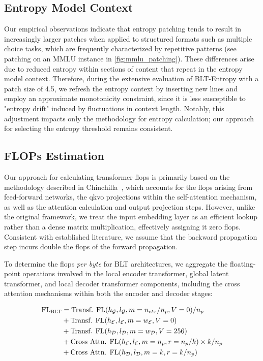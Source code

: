 \subsection{Entropy Model Context}
\label{section:entropy-context}
Our empirical observations indicate that entropy patching tends to result in increasingly larger patches when applied to structured formats such as multiple choice tasks, which are frequently characterized by repetitive patterns (see patching on an MMLU instance in \autoref{fig:mmlu_patching}). These differences arise due to reduced entropy within sections of content that repeat in the entropy model context. Therefore, during the extensive evaluation of {\textsc BLT}-Entropy with a patch size of 4.5, we refresh the entropy context by inserting new lines and employ an approximate monotonicity constraint, since it is less susceptible to "entropy drift" induced by fluctuations in context length. Notably, this adjustment impacts only the methodology for entropy calculation; our approach for selecting the entropy threshold remains consistent.

\subsection{FLOPs Estimation} 
\label{section:flops}

Our approach for calculating transformer flops is primarily based on the methodology described in Chinchilla~\citep{hoffmann2022training}, which accounts for the flops arising from feed-forward networks, the qkvo projections within the self-attention mechanism, as well as the attention calculation and output projection steps. However, unlike the original framework, we treat the input embedding layer as an efficient lookup rather than a dense matrix multiplication, effectively assigning it zero flops. Consistent with established literature, we assume that the backward propagation step incurs double the flops of the forward propagation.

To determine the flops \textit{per byte} for {\textsc BLT} architectures, we aggregate the floating-point operations involved in the local encoder transformer, global latent transformer, and local decoder transformer components, including the cross attention mechanisms within both the encoder and decoder stages:

\begin{align}
    \text{FL}_{\text{{\textsc BLT}}} &= \text{Transf. FL}(h_{\mathcal{G}}, l_{\mathcal{G}}, m=n_{ctx}/n_p,V=0) / n_p\\
   &+\text{Transf. FL}(h_{\mathcal{E}}, l_{\mathcal{E}}, m=w_{\mathcal{E}}, V=0) \\
   &+ \text{Transf. FL}(h_{\mathcal{D}}, l_{\mathcal{D}}, m=w_{\mathcal{D}}, V=256) \\ 
    &+ \text{Cross Attn. FL}(h_{\mathcal{E}}, l_{\mathcal{E}}, m=n_p, r=n_p/k) \times k/n_p \\ 
   &+ \text{Cross Attn. FL}(h_{\mathcal{D}}, l_{\mathcal{D}}, m=k, r=k/n_p) 
\end{align}

